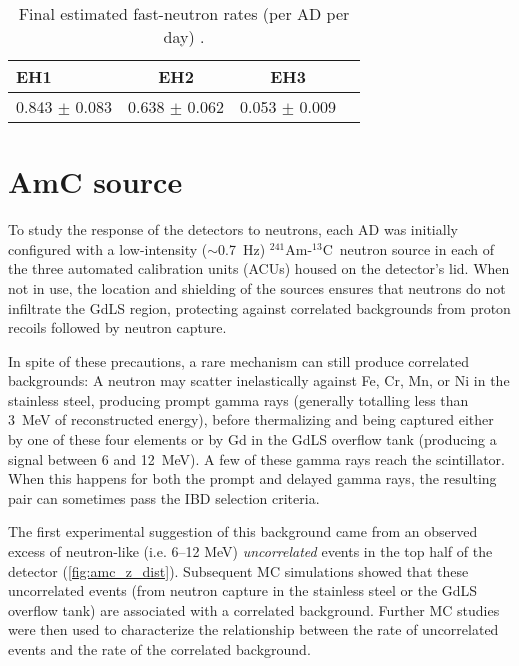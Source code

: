 \documentclass[../thesis.tex]{subfiles}
\begin{document}
\begin{table}[ht]
  \begin{tabular}{lccc}
    \toprule
    EH1 & EH2 & EH3 \\
    \midrule
    0.843 $\pm$ 0.083 & 0.638 $\pm$ 0.062 & 0.053 $\pm$ 0.009 \\
    \bottomrule
  \end{tabular}
  \caption{Final estimated fast-neutron rates (per AD per day) \cite{fastn}.}
  \label{tab:bkgFastnFinalRates}
\end{table}

\newcommand\AmC{$^{241}$Am-$^{13}$C}

\section{AmC source}
\label{sec:bkgAmC}

To study the response of the detectors to neutrons, each AD was initially configured with a low-intensity ($\sim$0.7~Hz) \AmC\ neutron source in each of the three automated calibration units (ACUs) housed on the detector's lid. When not in use, the location and shielding of the sources ensures that neutrons do not infiltrate the GdLS region, protecting against correlated backgrounds from proton recoils followed by neutron capture.

In spite of these precautions, a rare mechanism can still produce correlated backgrounds: A neutron may scatter inelastically against Fe, Cr, Mn, or Ni in the stainless steel, producing prompt gamma rays (generally totalling less than 3~MeV of reconstructed energy), before thermalizing and being captured either by one of these four elements or by Gd in the GdLS overflow tank (producing a signal between 6 and 12~MeV). A few of these gamma rays reach the scintillator. When this happens for both the prompt and delayed gamma rays, the resulting pair can sometimes pass the IBD selection criteria.

The first experimental suggestion of this background came from an observed excess of neutron-like (i.e. 6--12 MeV) \emph{uncorrelated} events in the top half of the detector (\autoref{fig:amc_z_dist}). Subsequent MC simulations showed that these uncorrelated events (from neutron capture in the stainless steel or the GdLS overflow tank) are associated with a correlated background. Further MC studies were then used to characterize the relationship between the rate of uncorrelated events and the rate of the correlated background.
\end{document}
